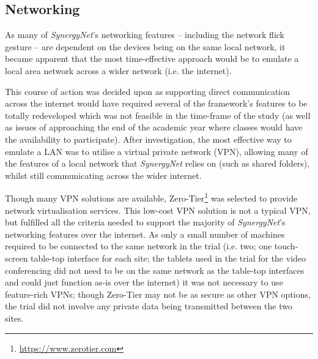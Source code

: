 \documentclass[twocolumn]{svjour3}          %
\begin{document}
\subsection{Networking}

As many of {\emph{SynergyNet}}’s networking features -- including the network flick gesture -- are dependent on the devices being on the same local network, it became apparent that the most time-effective approach would be to emulate a local area network across a wider network (i.e. the internet).

This course of action was decided upon as supporting direct communication across the internet would have required several of the framework’s features to be totally redeveloped which was not feasible in the time-frame of the study (as well as issues of approaching the end of the academic year where classes would have the availability to participate).
After investigation, the most effective way to emulate a LAN was to utilise a virtual private network (VPN), allowing many of the features of a local network that {\emph{SynergyNet}} relies on (such as shared folders), whilst still communicating across the wider internet.

Though many VPN solutions are available, Zero-Tier\footnote{\url{https://www.zerotier.com}} was selected to provide network virtualisation services.
This low-cost VPN solution is not a typical VPN, but fulfilled all the criteria needed to support the majority of {\emph{SynergyNet}}’s networking features over the internet.
As only a small number of machines required to be connected to the same network in the trial (i.e. two; one touch-screen table-top interface for each site; the tablets used in the trial for the video conferencing did not need to be on the same network as the table-top interfaces and could just function as-is over the internet) it was not necessary to use feature-rich VPNs; though Zero-Tier may not be as secure as other VPN options, the trial did not involve any private data being transmitted between the two sites.
\end{document}
